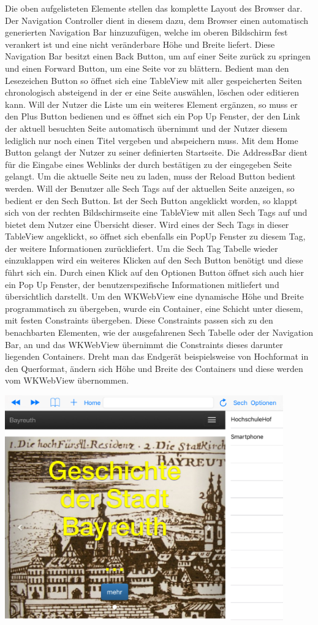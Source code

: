 Die oben aufgelisteten Elemente stellen das komplette Layout des Browser dar. Der Navigation Controller dient in diesem dazu, dem Browser einen automatisch generierten Navigation Bar hinzuzufügen, welche im oberen Bildschirm fest verankert ist und eine nicht veränderbare Höhe und Breite liefert. Diese Navigation Bar besitzt einen Back Button, um auf einer Seite zurück zu springen und einen Forward Button, um eine Seite vor zu blättern. Bedient man den Lesezeichen Button so öffnet sich eine TableView mit aller gespeicherten Seiten chronologisch absteigend in der er eine Seite auswählen, löschen oder editieren kann. Will der Nutzer die Liste um ein weiteres Element ergänzen, so muss er den Plus Button bedienen und es öffnet sich ein Pop Up Fenster, der den Link der aktuell besuchten Seite automatisch übernimmt und der Nutzer diesem lediglich nur noch einen Titel vergeben und abspeichern muss. Mit dem Home Button gelangt der Nutzer zu seiner definierten Startseite. Die AddressBar dient für die Eingabe eines Weblinks der durch bestätigen zu der eingegeben Seite gelangt. Um die aktuelle Seite neu zu laden, muss der Reload Button bedient werden. Will der Benutzer alle Sech Tags auf der aktuellen Seite anzeigen, so bedient er den Sech Button. Ist der Sech Button angeklickt worden, so klappt sich von der rechten Bildschirmseite eine TableView mit allen Sech Tags auf und bietet dem Nutzer eine Übersicht dieser. Wird eines der Sech Tags in dieser TableView angeklickt, so öffnet sich ebenfalls ein PopUp Fenster zu diesem Tag, der weitere Informationen zurückliefert. Um die Sech Tag Tabelle wieder einzuklappen wird ein weiteres Klicken auf den Sech Button benötigt und diese führt sich ein. Durch einen Klick auf den Optionen Button öffnet sich auch hier ein Pop Up Fenster, der benutzerspezifische Informationen mitliefert und übersichtlich darstellt. Um den WKWebView eine dynamische Höhe und Breite programmatisch zu übergeben, wurde ein Container, eine Schicht unter diesem, mit festen Constraints übergeben. Diese Constraints passen sich zu den benachbarten Elementen, wie der ausgefahrenen Sech Tabelle oder der Navigation Bar, an und das WKWebView übernimmt die Constraints dieses darunter liegenden Containers. Dreht man das Endgerät beispielsweise von Hochformat in den Querformat, ändern sich Höhe und Breite des Containers und diese werden vom WKWebView übernommen.

\includegraphics[width=12cm]{Pics/Browser_Hochformat}